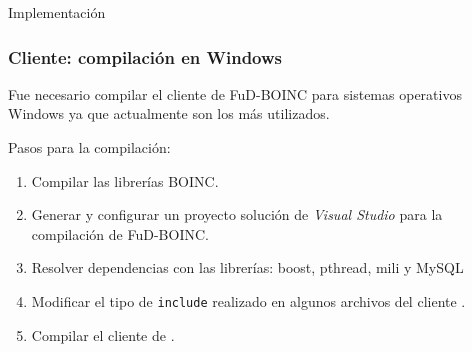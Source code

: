 \begin{subsection}{Implementación}
	\begin{frame}\frametitle{Cliente: compilación en Windows}
		\begin{block}{}
			Fue necesario compilar el cliente de FuD-BOINC para sistemas operativos Windows ya que actualmente son los más utilizados.
		\end{block}
		\begin{block}{}
			Pasos para la compilación:
			\vspace{2mm}
			\begin{enumerate}\addtolength{\itemsep}{1mm}
				\item Compilar las librerías BOINC.
				\item Generar y configurar un proyecto solución de \textit{Visual Studio} para la compilación de FuD-BOINC.
				\item Resolver dependencias con las librerías: boost, pthread, mili y MySQL
				\item Modificar el tipo de \texttt{include} realizado en algunos archivos del cliente \fud.
				\item Compilar el cliente de \fud.
			\end{enumerate}		
		\end{block}
	\end{frame}

\end{subsection}


